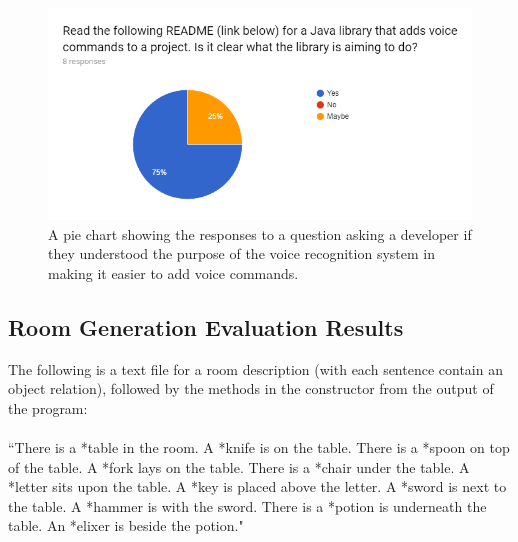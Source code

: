 \documentclass[11pt]{article}
\begin{document}
\begin{appendices}
\begin{center}
\begin{figure}[H]
\begin{center}
  \includegraphics[width=\linewidth]{survey-readme}
  \caption{A pie chart showing the responses to a question asking a developer if they understood the purpose of the voice recognition system in making it easier to add voice commands.}
  \label{fig:survey-readme}
  \end{center}
\end{figure}
\end{center}

\newpage
\subsection{Room Generation Evaluation Results}
\label{appendix:room-generation-results}

The following is a text file for a room description (with each sentence contain an object relation), followed by the methods in the constructor from the output of the program:
\\
\\
``There is a *table in the room. A *knife is on the table. There is a *spoon on top of the table. A *fork lays on the table. There is a *chair under the table. A *letter sits upon the table. A *key is placed above the letter. A *sword is next to the table. A *hammer is with the sword. There is a *potion is underneath the table. An *elixer is beside the potion."


\end{appendices}
\end{document}
